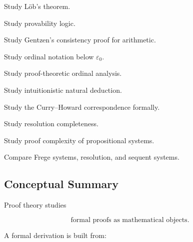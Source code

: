 \begin{exercise}[4]
Study Löb's theorem.
\end{exercise}

\begin{exercise}[4]
Study provability logic.
\end{exercise}

\begin{exercise}[4]
Study Gentzen's consistency proof for arithmetic.
\end{exercise}

\begin{exercise}[4]
Study ordinal notation below \(\varepsilon_0\).
\end{exercise}

\begin{exercise}[4]
Study proof-theoretic ordinal analysis.
\end{exercise}

\begin{exercise}[4]
Study intuitionistic natural deduction.
\end{exercise}

\begin{exercise}[4]
Study the Curry--Howard correspondence formally.
\end{exercise}

\begin{exercise}[4]
Study resolution completeness.
\end{exercise}

\begin{exercise}[4]
Study proof complexity of propositional systems.
\end{exercise}

\begin{exercise}[4]
Compare Frege systems, resolution, and sequent systems.
\end{exercise}

\subsection{Conceptual Summary}
\label{subsec:proof-theory-summary}

Proof theory studies

\[
\boxed{
\text{formal proofs as mathematical objects}.
}
\]

A formal derivation is built from:

